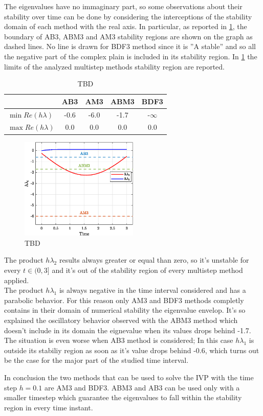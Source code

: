 \documentclass[11pt,a4paper,oneside]{article}
\begin{document}
The eigenvalues have no immaginary part, so some observations about their stability over time can be done by considering the interceptions of the stability domain of each method with the real axis.
In particular, as reported in \cref{fig:ex7_eig}, the boundary of AB3, ABM3 and AM3 stability regions are shown on the graph as dashed lines.
No line is drawn for BDF3 method since it is ''A stable'' and so all the negative part of the complex plain is included in its stability region.
In \cref{tab:ex7_stabLim} the limits of the analyzed multistep methods stability region are reported.
\begin{table}[htb]
    \centering
    \begin{tabular}{lcccc}
            \toprule
            \toprule
            & AB3 & AM3 & ABM3 & BDF3   \\ 
            \midrule
            $\min Re(h\lambda)$ & -0.6 & -6.0 & -1.7 & -$\infty$    \\
            $\max Re(h\lambda)$ & 0.0  & 0.0  & 0.0  & 0.0          \\
            \bottomrule
            \bottomrule
        \end{tabular}
    \caption{TBD}
    \label{tab:ex7_stabLim}
\end{table}

\clearpage

\begin{figure}[htb]
    \centering
    \includegraphics*[width=0.5\textwidth, keepaspectratio]{ex7_eig.eps}
    \caption[]{\label{fig:ex7_eig} TBD}
\end{figure}

The product $h\lambda_2$ results always greater or equal than zero, so it's unstable for every $t\in(0,3]$ and it's out of the stability region of every multistep method applied. \\
The product $h\lambda_1$ is always negative in the time interval considered and has a parabolic behavior.
For this reason only AM3 and BDF3 methods completly contains in their domain of numerical stability the eigenvalue envelop.
It's so explained the oscillatory behavior observed with the ABM3 method which doesn't include in its domain the eignevalue when its values drops behind -1.7.
The situation is even worse when AB3 method is considered; In this case $h\lambda_1$ is outside its stabiliy region as soon as it's value drops behind -0.6, which turns out be the case for the major part of the studied time interval.

In conclusion the two methods that can be used to solve the IVP with the time step $h=0.1$ are AM3 and BDF3. ABM3 and AB3 can be used only with a smaller timestep which guarantee the eigenvalues to fall within the stability region in every time instant.

\clearpage
\end{document}
